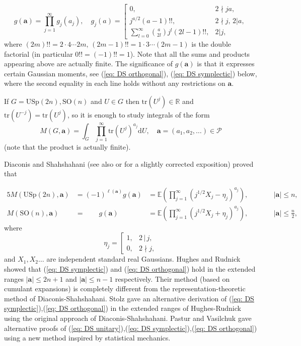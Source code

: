 \documentclass[alphabetic, 
        colorlinks,
        linkcolor=red,  citecolor=blue,
        backref
]{amsart}
\numberwithin{equation}{section}
\theoremstyle{definition}
\newcommand{\R}{{\mathbb R}}
\newcommand{\USp}{{\mathrm{USp}}}
\newcommand{\SO}{{\mathrm{SO}}}
\newcommand{\tr}{{\mathrm{tr}}}
\begin{document}
\begin{equation}\label{eq: def g}g(\mathbf a)=\prod_{j=1}^\infty g_j(a_j),\quad
g_j(a)=\left[\begin{array}{ll}0,&2\nmid ja,\\
j^{a/2}(a-1)!!,&2\nmid j,\,2|a,\\
\sum_{l=0}^\infty {a\choose 2l}j^l(2l-1)!!,&2|j,\end{array}\right.\end{equation}
where $(2m)!!=2\cdot 4\cdots 2m,\,(2m-1)!!=1\cdot 3\cdots (2m-1)$ is the double factorial (in particular $0!!=(-1)!!=1$). Note that all the sums and products appearing above are actually finite. The significance of $g(\mathbf a)$ is that it expresses certain Gaussian moments, see (\ref{eq: DS orthogonal}), (\ref{eq: DS symplectic}) below, where the second equality in each line holds without any restrictions on $\mathbf a$.

If $G=\USp(2n), \SO(n)$ and $U\in G$ then $\tr(U^j)\in\R$ and $\tr(U^{-j})=\tr(U^j)$, so it is enough to study integrals of the form 
$$M(G,\mathbf a)=\int_{G}\prod_{j=1}^\infty \tr(U^j)^{a_j}\mathrm d U,\quad\mathbf a=(a_1,a_2,\ldots)\in\mathcal P$$
(note that the product is actually finite).

Diaconis and Shahshahani \cite{DiSh94}
(see also \cite{DiEv01} or \cite[\S 3.3]{Mec19} for a slightly corrected exposition) proved that

\begin{alignat}{5}\label{eq: DS symplectic} M(\USp(2n),\mathbf a)&=(-1)^{\ell(\mathbf a)}g(\mathbf a)&=\mathbb E\left(\prod_{j=1}^\infty(j^{1/2}X_j-\eta_j)^{a_j}\right),&\quad\quad&|\mathbf a|\le n,\\ \label{eq: DS orthogonal}
M(\SO(n),\mathbf a)&=\quad\quad g(\mathbf a)&=\mathbb E\left(\prod_{j=1}^\infty (j^{1/2}X_j+\eta_j)^{a_j}\right),&\quad\quad&|\mathbf a|\le \frac n2,\end{alignat}
where
\begin{equation}\label{eq: def eta}\eta_j=\left[\begin{array}{ll}1,&2\,|\,j,\\0,&2\nmid j,\end{array}\right.\end{equation} and $X_1,X_2\ldots$ are independent standard real Gaussians. 
Hughes and Rudnick \cite{HuRu03} showed that (\ref{eq: DS symplectic}) and (\ref{eq: DS orthogonal}) hold in the extended ranges $|\mathbf a|\le 2n+1$ and $|\mathbf a|\le n-1$ respectively.
Their method (based on cumulant expansions) is completely different from the representation-theoretic method of Diaconis-Shahshahani. Stolz \cite{Sto05} gave an alternative derivation of (\ref{eq: DS symplectic}),(\ref{eq: DS orthogonal}) in the extended ranges of Hughes-Rudnick using the original approach of Diaconis-Shahshahani. 
Pastur and Vasilchuk \cite{PaVa04} gave alternative proofs of (\ref{eq: DS unitary}),(\ref{eq: DS symplectic}),(\ref{eq: DS orthogonal}) using a new method inspired by statistical mechanics.
\end{document}
